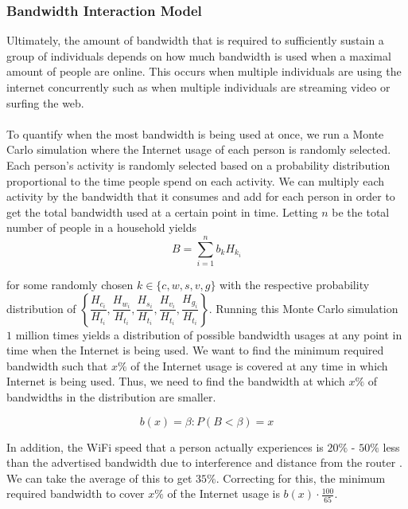 \documentclass[12pt]{article}
\begin{document}
\subsubsection{Bandwidth Interaction Model}
Ultimately, the amount of bandwidth that is required to sufficiently sustain a group of individuals depends on how much bandwidth is used when a maximal amount of people are online. This occurs when multiple individuals are using the internet concurrently such as when multiple individuals are streaming video or surfing the web.
\\
\\
To quantify when the most bandwidth is being used at once, we run a Monte Carlo simulation where the Internet usage of each person is randomly selected. Each person's activity is randomly selected based on a probability distribution proportional to the time people spend on each activity. We can multiply each activity by the bandwidth that it consumes and add for each person in order to get the total bandwidth used at a certain point in time. Letting $n$ be the total number of people in a household yields
$$B = \sum_{i = 1}^n b_k H_{k_i}$$

for some randomly chosen $k \in \{c, w, s, v, g\}$ with the respective probability distribution of $\left\{\dfrac{H_{c_i}}{H_{t_i}}, \dfrac{H_{w_i}}{H_{t_i}}, \dfrac{H_{s_i}}{H_{t_i}}, \dfrac{H_{v_i}}{H_{t_i}}, \dfrac{H_{g_i}}{H_{t_i}}\right\}$. Running this Monte Carlo simulation $1$ million times yields a distribution of possible bandwidth usages at any point in time when the Internet is being used. We want to find the minimum required bandwidth such that $x\%$ of the Internet usage is covered at any time in which Internet is being used. Thus, we need to find the bandwidth at which $x\%$ of bandwidths in the distribution are smaller.

$$b(x) = \beta : P\left(B < \beta\right) = x$$

In addition, the WiFi speed that a person actually experiences is $20\%$ - $50\%$ less than the advertised bandwidth due to interference and distance from the router \cite{m3}. We can take the average of this to get $35\%$. Correcting for this, the minimum required bandwidth to cover $x\%$ of the Internet usage is $b(x) \cdot \frac{100}{65}$.
\end{document}
